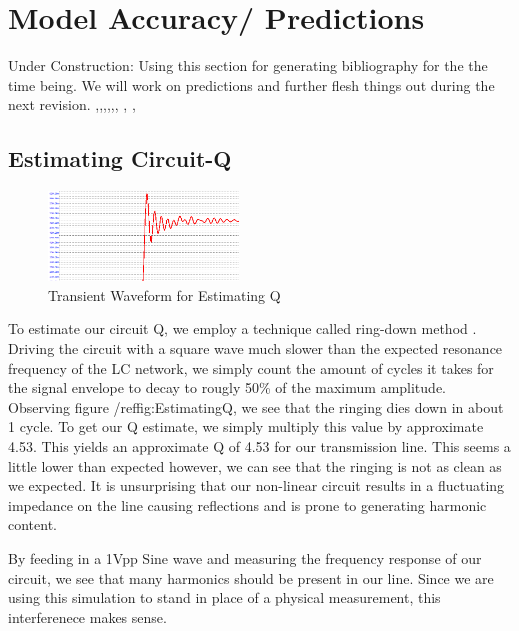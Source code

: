 \documentclass[journal]{IEEEtran} \usepackage[english]{babel}
\begin{document}
\section{ Model Accuracy/ Predictions }
Under Construction: Using this section for generating bibliography for the the
time being. We will work on predictions and further flesh things out during the
next revision.
\cite{ould2011circuit} \cite{distributedAnalogPhase},\cite{ellinger2003varactor},\cite{lee2012nonlinear},\cite{UltraCompact},\cite{EffVaractorCharac},\cite{FastHighVoltageNLTL}, \cite{nikoo2018theory}, \cite{TwoLine},\cite{ComputerExpNLTL}



\subsection{Estimating Circuit-Q}

\begin{figure}[htb]
\centering
\includegraphics[width=0.45\textwidth]{EstimatingQ.png}
\caption{Transient Waveform for Estimating Q
}\label{fig:EstimatingQ}
\end{figure}


To estimate our circuit Q, we employ a technique called ring-down method
\cite{giangrandi}. Driving the circuit with a square wave much slower than the
expected resonance frequency of the LC network, we simply count the amount of
cycles it takes for the signal envelope to decay to rougly 50\% of the maximum
amplitude. Observing figure /ref{fig:EstimatingQ}, we see that the ringing dies
down in about 1 cycle. To get our Q estimate, we simply multiply this value by
approximate 4.53. This yields an approximate Q of 4.53 for our transmission
line. This seems a little lower than expected however, we can see that the
ringing is not as clean as we expected.
It is unsurprising that our non-linear circuit results in a fluctuating
impedance on the line causing reflections and is prone to generating harmonic
content.

By feeding in a 1Vpp Sine wave and measuring the frequency response of our
circuit, we see that many harmonics should be present in our line. Since we are
using this simulation to stand in place of a physical measurement, this
interferenece makes sense.
\end{document}
